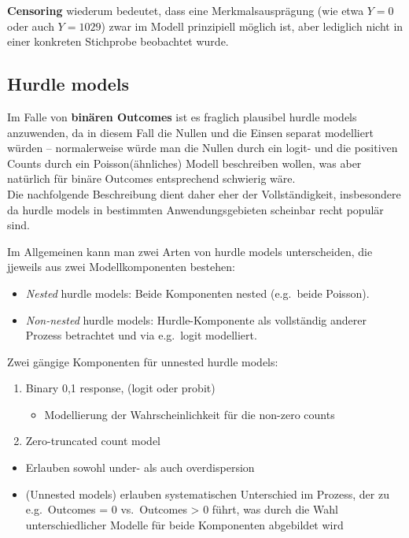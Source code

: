 \documentclass[ngerman,a4paper,]{scrartcl}
\providecommand{\tightlist}{%
  \setlength{\itemsep}{0pt}\setlength{\parskip}{0pt}}
\theoremstyle{definition}
\theoremstyle{definition}
\theoremstyle{definition}
\theoremstyle{remark}
\begin{document}
\textbf{Censoring} wiederum bedeutet, dass eine Merkmalsausprägung (wie etwa \(Y = 0\) oder auch \(Y = 1029\)) zwar im Modell prinzipiell möglich ist, aber lediglich nicht in einer konkreten Stichprobe beobachtet wurde.

\hypertarget{mod-hurdle}{%
\subsection{Hurdle models}\label{mod-hurdle}}

Im Falle von \textbf{binären Outcomes} ist es fraglich plausibel hurdle models anzuwenden, da in diesem Fall die Nullen und die Einsen separat modelliert würden -- normalerweise würde man die Nullen durch ein logit- und die positiven Counts durch ein Poisson(ähnliches) Modell beschreiben wollen, was aber natürlich für binäre Outcomes entsprechend schwierig wäre.\\
Die nachfolgende Beschreibung dient daher eher der Vollständigkeit, insbesondere da hurdle models in bestimmten Anwendungsgebieten scheinbar recht populär sind.

Im Allgemeinen kann man zwei Arten von hurdle models unterscheiden, die jjeweils aus zwei Modellkomponenten bestehen:

\begin{itemize}
\tightlist
\item
  \emph{Nested} hurdle models: Beide Komponenten nested (e.g.~beide Poisson).
\item
  \emph{Non-nested} hurdle models: Hurdle-Komponente als vollständig anderer Prozess betrachtet und via e.g.~logit modelliert.
\end{itemize}

Zwei gängige Komponenten für unnested hurdle models:

\begin{enumerate}
\def\labelenumi{\arabic{enumi}.}
\tightlist
\item
  Binary 0,1 response, (logit oder probit)

  \begin{itemize}
  \tightlist
  \item
    Modellierung der Wahrscheinlichkeit für die non-zero counts
  \end{itemize}
\item
  Zero-truncated count model
\end{enumerate}

\begin{itemize}
\tightlist
\item
  Erlauben sowohl under- als auch overdispersion
\item
  (Unnested models) erlauben systematischen Unterschied im Prozess, der zu e.g.~Outcomes = 0 vs.~Outcomes \textgreater{} 0 führt, was durch die Wahl unterschiedlicher Modelle für beide Komponenten abgebildet wird
\end{itemize}
\end{document}
